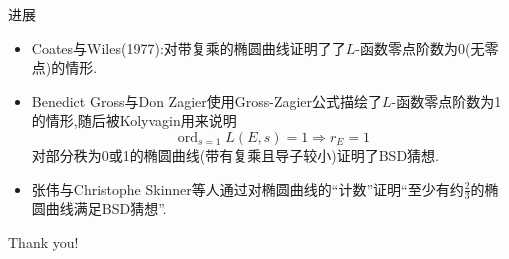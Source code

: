 \documentclass[pdf]{beamer}
\numberwithin{equation}{section}
\theoremstyle{plain}
\theoremstyle{plain}
\theoremstyle{plain}
\theoremstyle{remark}
\newcommand{\ord}{\operatorname{ord}}
\begin{document}
\begin{frame}[fragile]{进展}
\begin{itemize}
	\item Coates与Wiles(1977):对带复乘的椭圆曲线证明了了$L$-函数零点阶数为0(无零点)的情形.
	\item Benedict Gross与Don Zagier使用Gross-Zagier公式描绘了$L$-函数零点阶数为1的情形,随后被Kolyvagin用来说明
	$$\ord_{s=1}L(E,s)=1 \Longrightarrow r_E=1$$
	对部分秩为0或1的椭圆曲线(带有复乘且导子较小)证明了BSD猜想.
	\item 张伟与Christophe  Skinner等人通过对椭圆曲线的“计数”证明“至少有约$\frac{2}{3}$的椭圆曲线满足BSD猜想”.
\end{itemize}
\end{frame}
\begin{frame}[fragile]
Thank you!

\end{frame}




\end{document}
